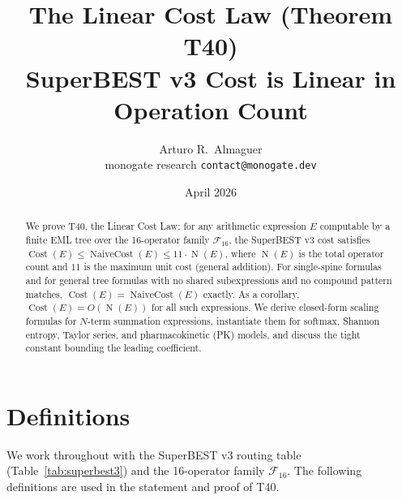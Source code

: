 \documentclass[12pt,a4paper]{article}
\title{The Linear Cost Law (Theorem T40)\\[6pt]
       \large SuperBEST v3 Cost is Linear in Operation Count}
\author{Arturo R.\ Almaguer\\
\small monogate research \quad \texttt{contact@monogate.dev}}
\date{April 2026}
\theoremstyle{definition}
\newcommand{\Cost}{\operatorname{Cost}}
\newcommand{\NC}{\operatorname{NaiveCost}}
\newcommand{\NOp}{\operatorname{N}}
\begin{document}
\maketitle

\begin{abstract}
We prove T40, the Linear Cost Law: for any arithmetic expression $E$
computable by a finite EML tree over the 16-operator family
$\mathcal{F}_{16}$, the SuperBEST v3 cost satisfies
$\Cost(E) \leq \NC(E) \leq 11 \cdot \NOp(E)$,
where $\NOp(E)$ is the total operator count and $11$ is the maximum unit cost
(general addition).
For single-spine formulas and for general tree formulas with no shared
subexpressions and no compound pattern matches, $\Cost(E) = \NC(E)$ exactly.
As a corollary, $\Cost(E) = O(\NOp(E))$ for all such expressions.
We derive closed-form scaling formulas for $N$-term summation expressions,
instantiate them for softmax, Shannon entropy, Taylor series, and
pharmacokinetic (PK) models, and discuss the tight constant bounding
the leading coefficient.
\end{abstract}

\tableofcontents
\bigskip

\section{Definitions}
\label{sec:definitions}

We work throughout with the SuperBEST v3 routing table
(Table~\ref{tab:superbest3}) and the 16-operator family $\mathcal{F}_{16}$.
The following definitions are used in the statement and proof of T40.
\end{document}

